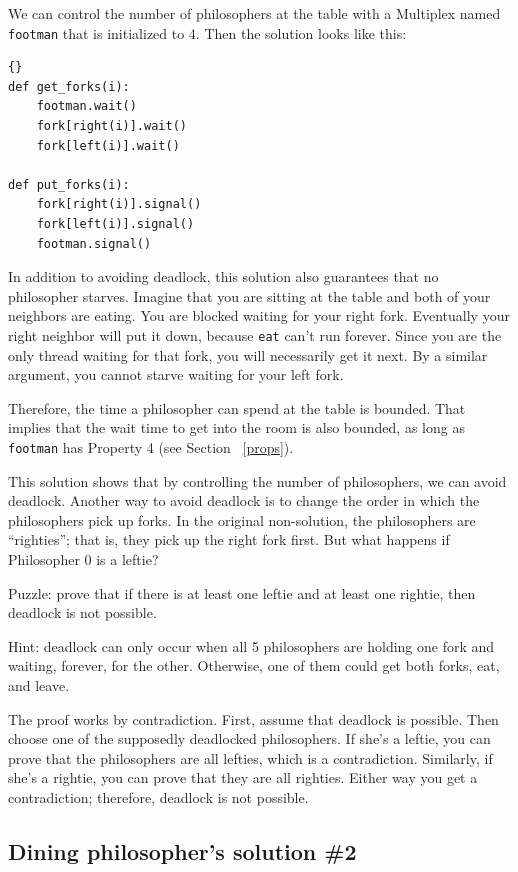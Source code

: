 \documentclass{book}
\newcommand{\clearemptydoublepage}{\newpage\cleardoublepage}
\begin{document}
We can control the number of philosophers at the table with
a Multiplex named {\tt footman} that is initialized to 4.
Then the solution looks like this:

\begin{lstlisting}[title={Dining philosophers solution \#1}]{}
def get_forks(i):
    footman.wait()
    fork[right(i)].wait()
    fork[left(i)].wait()

def put_forks(i):
    fork[right(i)].signal()
    fork[left(i)].signal()
    footman.signal()
\end{lstlisting}

In addition to avoiding deadlock, this solution also guarantees that
no philosopher starves.
Imagine that you
are sitting at the table and both of your neighbors are eating.  You
are blocked waiting for your right fork.  Eventually your right
neighbor will put it down, because {\tt eat} can't run forever.  Since
you are the only thread waiting for that fork, you will necessarily
get it next.  By a similar argument, you cannot starve waiting for
your left fork.

Therefore, the time a philosopher can spend at the table is bounded.
That implies that the wait time to get into the room is also bounded,
as long as {\tt footman} has Property 4 (see Section ~\ref{props}).

This solution shows that
by controlling the number of philosophers, we can avoid deadlock.
Another way to avoid deadlock is to change the order in which the
philosophers pick up forks.  In the original non-solution, the
philosophers are ``righties''; that is, they pick up the right fork
first.  But what happens if Philosopher 0 is a leftie?

Puzzle: prove that if there is at least one leftie and at least one
rightie, then deadlock is not possible.

Hint: deadlock can only occur when all 5 philosophers are holding
one fork and waiting, forever, for the other.  Otherwise, one of
them could get both forks, eat, and leave.

The proof works by contradiction.  First, assume that deadlock is
possible.  Then choose one of the supposedly deadlocked philosophers.
If she's a leftie, you can prove that the philosophers are all
lefties, which is a contradiction.  Similarly, if she's a rightie, you
can prove that they are all righties.  Either way you get a
contradiction; therefore, deadlock is not possible.


\clearemptydoublepage
\subsection{Dining philosopher's solution \#2}
\end{document}
